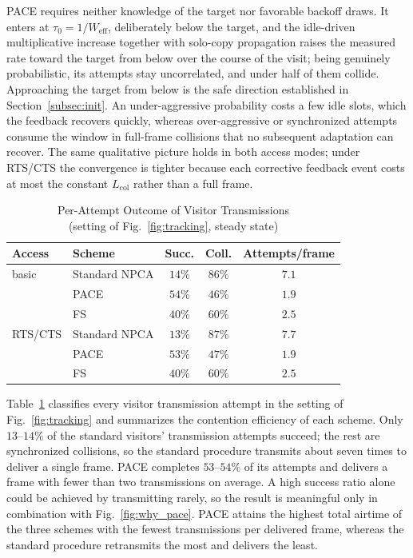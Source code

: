 \documentclass[conference]{IEEEtran}
\begin{document}
PACE requires neither knowledge of the target nor favorable backoff
draws. It enters at
$\tau_0=1/W_\mathrm{eff}$, deliberately below the target, and the
idle-driven multiplicative increase together with solo-copy propagation
raises the measured rate toward the target from below over the
course of the visit; being genuinely probabilistic, its attempts
stay uncorrelated, and under half of them collide. Approaching the
target from below is the safe direction established in
Section~\ref{subsec:init}. An under-aggressive probability costs a few
idle slots, which the feedback recovers quickly, whereas over-aggressive
or synchronized attempts consume the window in full-frame collisions
that no subsequent adaptation can recover. The same qualitative picture holds
in both access modes; under RTS/CTS the convergence is tighter because
each corrective feedback event costs at most the constant
$L_\mathrm{col}$ rather than a full frame.

\begin{table}[t]
\centering
\caption{Per-Attempt Outcome of Visitor Transmissions\\(setting of Fig.~\ref{fig:tracking}, steady state)}
\label{tab:attempts}
\begin{tabular}{llccc}
\hline
\textbf{Access} & \textbf{Scheme} & \textbf{Succ.} & \textbf{Coll.} & \textbf{Attempts/frame} \\
\hline
basic   & Standard NPCA & $14\%$ & $86\%$ & $7.1$ \\
        & PACE          & $54\%$ & $46\%$ & $1.9$ \\
        & FS            & $40\%$ & $60\%$ & $2.5$ \\
\hline
RTS/CTS & Standard NPCA & $13\%$ & $87\%$ & $7.7$ \\
        & PACE          & $53\%$ & $47\%$ & $1.9$ \\
        & FS            & $40\%$ & $60\%$ & $2.5$ \\
\hline
\end{tabular}
\end{table}

Table~\ref{tab:attempts} classifies every visitor transmission attempt
in the setting of Fig.~\ref{fig:tracking} and summarizes the
contention efficiency of each scheme. Only $13$--$14\%$ of the
standard visitors' transmission attempts succeed; the rest are
synchronized collisions, so the standard procedure transmits about
seven times to deliver a single frame. PACE completes $53$--$54\%$ of
its attempts and delivers a frame with fewer than two transmissions on
average. A high success ratio alone could be achieved by transmitting
rarely, so the result is meaningful only in combination with
Fig.~\ref{fig:why_pace}. PACE attains the highest total airtime of the
three schemes with the fewest transmissions per delivered frame,
whereas the standard procedure retransmits the most and delivers the
least.
\end{document}

